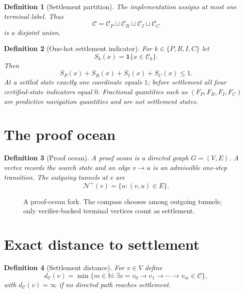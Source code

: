 \documentclass[11pt]{article}
\newtheorem{definition}{Definition}[section]
\newcommand{\Cset}{\mathcal C}
\newcommand{\N}{\mathcal N}
\newcommand{\Nat}{\mathbb N}
\begin{document}
\begin{definition}[Settlement partition]
The implementation assigns at most one terminal label. Thus
\[
\Cset=\Cset_P\sqcup\Cset_R\sqcup\Cset_I\sqcup\Cset_C
\]
is a disjoint union.
\end{definition}

\begin{definition}[One-hot settlement indicator]
For $k\in\{P,R,I,C\}$ let
\[
S_k(x)=\mathbf 1\{x\in\Cset_k\}.
\]
Then
\[
\boxed{S_P(x)+S_R(x)+S_I(x)+S_C(x)\le 1.}
\]
At a settled state exactly one coordinate equals $1$; before settlement all four certified-state indicators equal $0$. Fractional quantities such as $(F_P,F_R,F_I,F_C)$ are predictive navigation quantities and are not settlement states.
\end{definition}

\section{The proof ocean}
\begin{definition}[Proof ocean]
A proof ocean is a directed graph $G=(V,E)$. A vertex records the search state and an edge $v\to u$ is an admissible one-step transition. The outgoing tunnels at $v$ are
\[
\N^+(v)=\{u:(v,u)\in E\}.
\]
\end{definition}

\begin{figure}[ht]
\centering
{}
\caption{A proof-ocean fork. The compass chooses among outgoing tunnels; only verifier-backed terminal vertices count as settlement.}
\end{figure}

\section{Exact distance to settlement}
\begin{definition}[Settlement distance]
For $v\in V$ define
\[
d_{\Cset}(v)=\min\{m\in\Nat:\exists v=v_0\to v_1\to\cdots\to v_m\in\Cset\},
\]
with $d_{\Cset}(v)=\infty$ if no directed path reaches settlement.
\end{definition}
\end{document}
